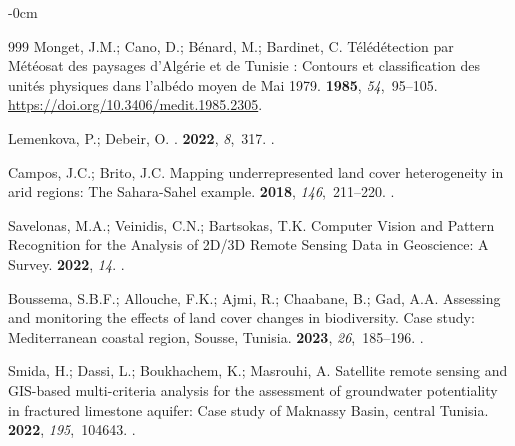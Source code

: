 \documentclass[land,article,accept,pdftex,moreauthors]{Definitions/mdpi}
\begin{document}
\begin{adjustwidth}{-\extralength}{0cm}
\begin{thebibliography}{999}
Monget, J.M.; Cano, D.; B\'{e}nard, M.; Bardinet, C.
\newblock T\'{e}l\'{e}d\'{e}tection par M\'{e}t\'{e}osat des paysages
  d'Alg\'{e}rie et de Tunisie : Contours et classification des unit\'{e}s
  physiques dans l'alb\'{e}do moyen de Mai 1979.
 {\bf 1985}, {\em 54},~95--105.
\newblock %
  {\url{https://doi.org/10.3406/medit.1985.2305}}.

Lemenkova, P.; Debeir, O.
.
 {\bf 2022}, {\em 8},~317.
.

Campos, J.C.; Brito, J.C.
\newblock Mapping underrepresented land cover heterogeneity in arid regions:
  The Sahara-Sahel example.
 {\bf 2018},
  {\em 146},~211--220.
.

Savelonas, M.A.; Veinidis, C.N.; Bartsokas, T.K.
\newblock Computer Vision and Pattern Recognition for the Analysis of 2D/3D
  Remote Sensing Data in Geoscience: A Survey.
 {\bf 2022}, {\em 14}.
.

Boussema, S.B.F.; Allouche, F.K.; Ajmi, R.; Chaabane, B.; Gad, A.A.
\newblock Assessing and monitoring the effects of land cover changes in
  biodiversity. Case study: Mediterranean coastal region, Sousse, Tunisia.
 {\bf
  2023}, {\em 26},~185--196.
.

Smida, H.; Dassi, L.; Boukhachem, K.; Masrouhi, A.
\newblock Satellite remote sensing and GIS-based multi-criteria analysis for
  the assessment of groundwater potentiality in fractured limestone aquifer:
  Case study of Maknassy Basin, central Tunisia.
 {\bf 2022}, {\em
  195},~104643.
.


\end{thebibliography}
\end{adjustwidth}
\end{document}
